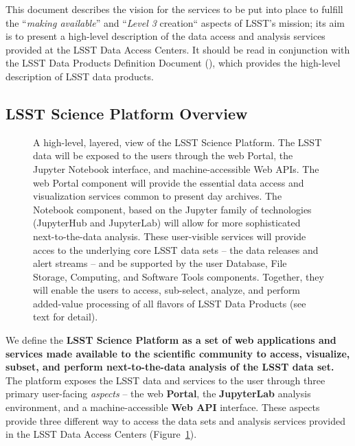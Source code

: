 \documentclass[DM,lsstdraft,toc]{lsstdoc}
\begin{document}
This document describes the vision for the services to be put into place to
fulfill the ``{\em making available}'' and ``{\em Level 3} creation``
aspects of LSST's mission; its aim is to present a high-level
description of the data access and analysis services provided at the
LSST Data Access Centers. It should be read in conjunction with the
LSST Data Products Definition Document (\DPDD), which provides the high-level
description of LSST data products.

\subsection{LSST Science Platform Overview}

\begin{figure}
\centering
{}
\caption{
A high-level, layered, view of the LSST Science Platform.  The LSST data
will be exposed to the users through the web Portal, the Jupyter Notebook
interface, and machine-accessible Web APIs.  The web Portal component will
provide the essential data access and visualization services common to
present day archives.  The Notebook component, based on the Jupyter family
of technologies (JupyterHub and JupyterLab) will allow for more
sophisticated next-to-the-data analysis.  These user-visible services will
provide acces to the underlying core LSST data sets -- the data releases and
alert streams -- and be supported by the user Database, File Storage,
Computing, and Software Tools components.  Together, they will enable the
users to access, sub-select, analyze, and perform added-value processing of
all flavors of LSST Data Products (see text for detail). 
\label{fig:layeredLSP}}
\end{figure}

We define the {\bf LSST Science Platform as a set of web applications and services
made available to the scientific community to access, visualize, subset, and
perform next-to-the-data analysis of the LSST data set.}  The platform exposes the LSST data
and services to the user through three primary user-facing {\it aspects} -- the web {\bf Portal},
the {\bf JupyterLab} analysis environment, and a machine-accessible {\bf Web API} interface. These aspects provide three different way to access the data sets and analysis services provided in the LSST Data Access Centers (Figure~\ref{fig:layeredLSP}).
\end{document}
